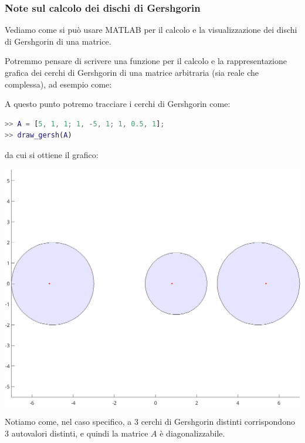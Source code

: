 \documentclass[a4paper,11pt]{article}
\begin{document}
\subsubsection{Note sul calcolo dei dischi di Gershgorin}
Vediamo come si può usare MATLAB per il calcolo e la visualizzazione dei dischi di Gershgorin di una matrice.

Potremmo pensare di scrivere una funzione per il calcolo e la rappresentazione grafica dei cerchi di Gershgorin di una matrice arbitraria (sia reale che complessa), ad esempio come:
\lstset{style=codestyle, language=matlab}


A questo punto potremo tracciare i cerchi di Gershgorin come:
\begin{lstlisting}[language=matlab, style=codestyle]	
>> A = [5, 1, 1; 1, -5, 1; 1, 0.5, 1];
>> draw_gersh(A)
\end{lstlisting}

\begin{minipage}{\textwidth}
da cui si ottiene il grafico:
\begin{center}
\includegraphics{../figures/gersh.png}
\end{center}
\end{minipage}

Notiamo come, nel caso specifico, a 3 cerchi di Gershgorin distinti corrispondono 3 autovalori distinti, e quindi la matrice $A$ è diagonalizzabile.
\end{document}
